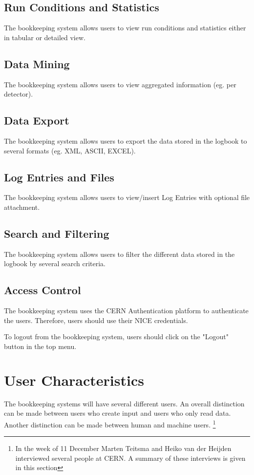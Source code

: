 \subsection{Run Conditions and Statistics}
The bookkeeping system allows users to view run conditions and statistics either in tabular or detailed view.

\subsection{Data Mining}
The bookkeeping system allows users to view aggregated information (eg. per detector).
\subsection{Data Export}
The bookkeeping system allows users to export the data stored in the logbook to several formats (eg. XML, ASCII, EXCEL).
\subsection{Log Entries and Files}
The bookkeeping system allows users to view/insert Log Entries with optional file attachment.

\subsection{Search and Filtering}
The bookkeeping system allows users to filter the different data stored in the logbook by several search criteria.

\subsection{Access Control}
The bookkeeping system uses the CERN Authentication platform to authenticate the users. Therefore, users should use their NICE credentials.

To logout from the bookkeeping system, users should click on the "Logout" button in the top menu.



\section{User Characteristics}
The bookkeeping systems will have several different users. An overall distinction can be made between users who create input and users who only read data. Another distinction can be made between human and machine users. \footnote{In the week of 11 December Marten Teitsma and Heiko van der Heijden interviewed several people at CERN. A summary of these interviews is given in this section}

